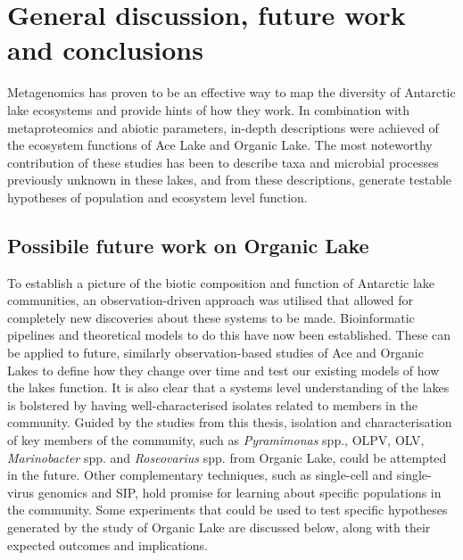 \chapter{General discussion, future work and conclusions}
\label{ch:conc}
\acresetall

Metagenomics has proven to be an effective way to map the diversity of Antarctic lake ecosystems and provide hints of how they work.
In combination with metaproteomics and abiotic parameters, in-depth descriptions were achieved of the ecosystem functions of Ace Lake and Organic Lake.
The most noteworthy contribution of these studies has been to describe taxa and microbial processes previously unknown in these lakes, and from these descriptions, generate testable hypotheses of population and ecosystem level function.
\section{Possibile future work on Organic Lake}
To establish a picture of the biotic composition and function of Antarctic lake communities, an observation-driven approach was utilised that allowed for completely new discoveries about these systems to be made.
Bioinformatic pipelines and theoretical models to do this have now been established.
These can be applied to future, similarly observation-based studies of Ace and Organic Lakes to define how they change over time and test our existing models of how the lakes function.
It is also clear that a systems level understanding of the lakes is bolstered by having well-characterised isolates related to members in the community.
Guided by the studies from this thesis, isolation and characterisation of key members of the community, such as \emph{Pyramimonas} spp., \ac{OLPV}, \ac{OLV}, \emph{Marinobacter} spp. and \emph{Roseovarius} spp. from Organic Lake, could be attempted in the future.
Other complementary techniques, such as single-cell and single-virus genomics and \ac{SIP}, hold promise for learning about specific populations in the community.
Some experiments that could be used to test specific hypotheses generated by the study of Organic Lake are discussed below, along with their expected outcomes and implications.

